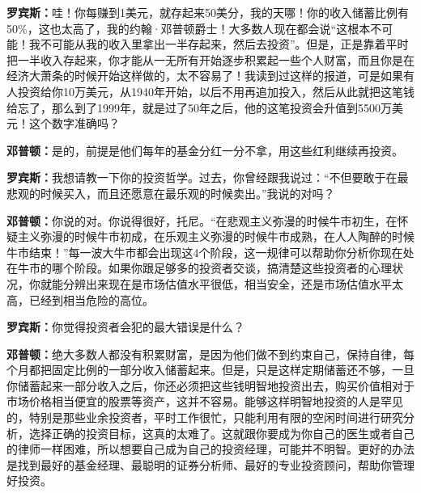 \begin{BookQuote}
\textbf{罗宾斯：}哇！你每赚到1美元，就存起来50美分，我的天哪！你的收入储蓄比例有50\%，这也太高了，我的约翰·邓普顿爵士！大多数人现在都会说“这根本不可能！我不可能从我的收入里拿出一半存起来，然后去投资”。但是，正是靠着平时把一半收入存起来，你才能从一无所有开始逐步积累起一些个人财富，而且你是在经济大萧条的时候开始这样做的，太不容易了！我读到过这样的报道，可是如果有人投资给你10万美元，从1940年开始，以后不用再追加投入，然后从此就把这笔钱给忘了，那么到了1999年，就是过了50年之后，他的这笔投资会升值到5500万美元！这个数字准确吗？
\end{BookQuote}

\begin{BookQuote}
\textbf{邓普顿：}是的，前提是他们每年的基金分红一分不拿，用这些红利继续再投资。
\end{BookQuote}

\begin{BookQuote}
\textbf{罗宾斯：}我想请教一下你的投资哲学。过去，你曾经跟我说过：“不但要敢于在最悲观的时候买入，而且还愿意在最乐观的时候卖出。”我说的对吗？
\end{BookQuote}

\begin{BookQuote}
\textbf{邓普顿：}你说的对。你说得很好，托尼。“在悲观主义弥漫的时候牛市初生，在怀疑主义弥漫的时候牛市初成，在乐观主义弥漫的时候牛市成熟，在人人陶醉的时候牛市结束！”每一波大牛市都会出现这4个阶段，这一规律可以帮助你分析你现在处在牛市的哪个阶段。如果你跟足够多的投资者交谈，搞清楚这些投资者的心理状况，你就能分辨出来现在是市场估值水平很低，相当安全，还是市场估值水平太高，已经到相当危险的高位。
\end{BookQuote}

\begin{BookQuote}
\textbf{罗宾斯：}你觉得投资者会犯的最大错误是什么？
\end{BookQuote}

\begin{BookQuote}
\textbf{邓普顿：}绝大多数人都没有积累财富，是因为他们做不到约束自己，保持自律，每个月都把固定比例的一部分收入储蓄起来。但是，只是这样定期储蓄还不够，一旦你储蓄起来一部分收入之后，你还必须把这些钱明智地投资出去，购买价值相对于市场价格相当便宜的股票等资产，这并不容易。能够这样明智地投资的人是罕见的，特别是那些业余投资者，平时工作很忙，只能利用有限的空闲时间进行研究分析，选择正确的投资目标，这真的太难了。这就跟你要成为你自己的医生或者自己的律师一样困难，所以想要自己成为自己的投资经理，可能并不明智。更好的办法是找到最好的基金经理、最聪明的证券分析师、最好的专业投资顾问，帮助你管理好投资。
\end{BookQuote}

